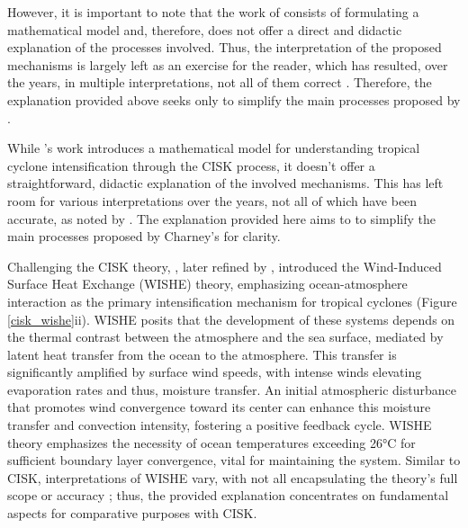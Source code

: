 However, it is important to note that the work of \citet{charney1964growth} consists of formulating a mathematical model and, therefore, does not offer a direct and didactic explanation of the processes involved. Thus, the interpretation of the proposed mechanisms is largely left as an exercise for the reader, which has resulted, over the years, in multiple interpretations, not all of them correct \citep{ooyama1982conceptual}. Therefore, the explanation provided above seeks only to simplify the main processes proposed by \citet{charney1964growth}.

While \citet{charney1964growth}'s work introduces a mathematical model for understanding tropical cyclone intensification through the CISK process, it doesn't offer a straightforward, didactic explanation of the involved mechanisms. This has left room for various interpretations over the years, not all of which have been accurate, as noted by \citet{ooyama1982conceptual}. The explanation provided here aims to to simplify the main processes proposed by Charney's for clarity.

Challenging the CISK theory, \citet{emanuel1986air}, later refined by \citet{yano1991improved}, introduced the Wind-Induced Surface Heat Exchange (WISHE) theory, emphasizing ocean-atmosphere interaction as the primary intensification mechanism for tropical cyclones (Figure \ref{cisk_wishe}ii). WISHE posits that the development of these systems depends on the thermal contrast between the atmosphere and the sea surface, mediated by latent heat transfer from the ocean to the atmosphere. This transfer is significantly amplified by surface wind speeds, with intense winds elevating evaporation rates and thus, moisture transfer. An initial atmospheric disturbance that promotes wind convergence toward its center can enhance this moisture transfer and convection intensity, fostering a positive feedback cycle. WISHE theory emphasizes the necessity of ocean temperatures exceeding 26°C for sufficient boundary layer convergence, vital for maintaining the system. Similar to CISK, interpretations of WISHE vary, with not all encapsulating the theory's full scope or accuracy \citep{montgomery2014paradigms}; thus, the provided explanation concentrates on fundamental aspects for comparative purposes with CISK.

